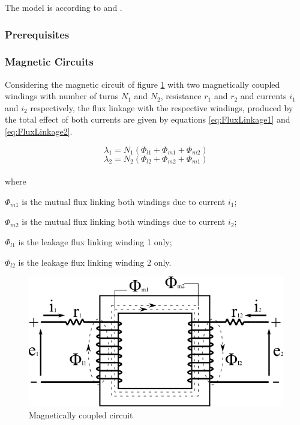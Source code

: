 The model is according to \cite{wang2010methods} and \cite{kundur1994power}. 

\subsubsection{Prerequisites}


\subsubsection{Magnetic Circuits}

Considering the magnetic circuit of figure \ref{fig:MagneticCircuit} with two magnetically coupled windings with number of turns $N_1$ and $N_2$, resistance $r_1$ and $r_2$ and currents $i_1$ and $i_2$ respectively, the flux linkage with the respective windings, produced by the total effect of both currents are given by equations \ref{eq:FluxLinkage1} and \ref{eq:FluxLinkage2}.

\begin{equation} \label{eq:FluxLinkage1}
	\lambda_1 = N_1(\Phi_{l1} + \Phi_{m1} + \Phi_{m2})
\end{equation}
\begin{equation} \label{eq:FluxLinkage2}
	\lambda_2 = N_2(\Phi_{l2} + \Phi_{m2} + \Phi_{m1})
\end{equation}
\\
where

$\Phi_{m1}$ is the mutual flux linking both windings due to current $i_1$;

$\Phi_{m2}$ is the mutual flux linking both windings due to current $i_2$;

$\Phi_{l1}$ is the leakage flux linking winding 1 only;

$\Phi_{l2}$ is the leakage flux linking winding 2 only.

\begin{figure}[h]
	\centering
	\includegraphics[scale=0.6]{img/MagneticCircuit.png} 
	\caption{Magnetically coupled circuit}
	\label{fig:MagneticCircuit}
\end{figure}

